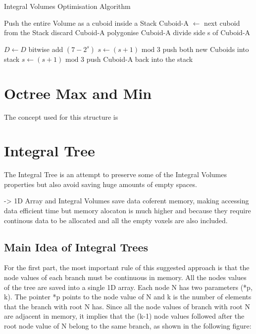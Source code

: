 \documentclass{subfiles}
\begin{document}
\begin{algorithm}[!htbp]
	\caption{Integral Volumes Optimisation Algorithm}
	\label{alg:IVoptAdvance}
	\centering
	\begin{algorithmic}[1]
		\State Push the entire Volume as a cuboid inside a Stack
			\State Cuboid-A   $\gets$  next cuboid from the Stack 
				\State	discard Cuboid-A
				\State polygonise Cuboid-A
				\State	divide side s of Cuboid-A 
		
					\State	$D \gets D$ bitwise add $(7-2^s)$
				\EndIf
				\State 	$s \gets (s+1) \text{ mod } 3$
				\State push both new Cuboids into stack
			\Else 
				\State $s \gets (s+1) \text{ mod } 3$
				\State push Cuboid-A back into the stack
			\EndIf
		\EndWhile
	\end{algorithmic}
\end{algorithm}


\section{Octree Max and Min} \label{sec:OctreeMaxMin}
The concept used for this structure is 


\section{Integral Tree}\label{sec:ITopt}
The Integral Tree is an attempt to preserve some of the Integral Volumes properties but also avoid saving huge amounts of empty spaces.  

-> 1D Array and Integral Volumes save data coferent memory, making accessing data efficient time but memory alocaton is much higher and because they require continous data to be allocated and all the empty voxels are also included. 

\subsection{Main Idea of Integral Trees}

\par For the first part, the most important rule of this suggested approach is that the node values of each branch must be continuous in memory. All the nodes values of the tree are saved into a single 1D array. Each node N has two parameters (*p, k). The pointer *p points to the node value of N and k is the number of elements that the branch with root N has. Since all the node values of branch with root N are adjacent in memory, it implies that the (k-1) node values followed after the root node value of N belong to the same branch, as shown in the following figure:
\end{document}
